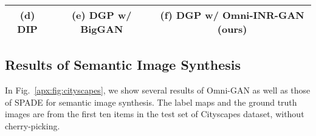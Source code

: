 \documentclass[paper_2425.tex]{subfiles}
\begin{document}
\begin{figure*}[!t]
{\begin{tabular}{cc|ccc}
      \\
      (d) DIP                                                                                                                                     & (e) DGP w/ BigGAN            & \multicolumn{3}{c}{(f) DGP w/ Omni-INR-GAN (ours)}                                                                    \\
      \midrule
    \end{tabular}
  }
  \vspace{-0.3cm}
  \caption{Super-resolution using Omni-INR-GAN's prior, at any scale (-). (b) input image with low resolution. (c) LIIF~\cite{chen2020Learning} can extrapolate the input image to any scale, but it cannot add semantic details, so the result is still blurred. (d) DIP~\cite{ulyanov2018Deep} also failed because the input image resolution is too low. (e) DGP~\cite{pan2020Exploiting} with BigGAN must crop the input and upsamples the cropped patch to a fixed size, which is inflexible. (f) Omni-INR-GAN has the ability to upsample the input image to any scale and also adds rich semantic details.}
\label{apx:fig:dgp_SR}
  \vspace{-.5cm}
\end{figure*}


\subsection{Results of Semantic Image Synthesis}

In Fig.~\ref{apx:fig:cityscapes}, we show several results of Omni-GAN as well as those of SPADE for semantic image synthesis. The label maps and the ground truth images are from the first ten items in the test set of Cityscapes dataset, without cherry-picking.
\end{document}
